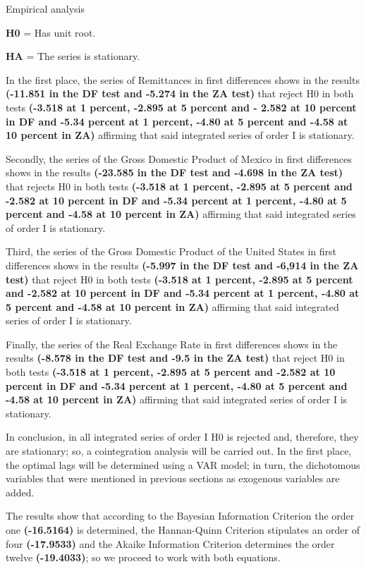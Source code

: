 \begin{frame}{Empirical analysis}
\begin{center}
\textbf{H0} = Has unit root.\par
\textbf{HA} = The series is stationary.
\end{center}
In the first place, the series of Remittances in first differences shows in the results \textbf{(-11.851 in the DF test and -5.274 in the ZA test)} that reject H0 in both tests \textbf{(-3.518 at 1 percent, -2.895 at 5 percent and - 2.582 at 10 percent in DF and -5.34 percent at 1 percent, -4.80 at 5 percent and -4.58 at 10 percent in ZA)} affirming that said integrated series of order I is stationary.\par
Secondly, the series of the Gross Domestic Product of Mexico in first differences shows in the results \textbf{(-23.585 in the DF test and -4.698 in the ZA test)} that rejects H0 in both tests \textbf{(-3.518 at 1 percent, -2.895 at 5 percent and -2.582 at 10 percent in DF and -5.34 percent at 1 percent, -4.80 at 5 percent and -4.58 at 10 percent in ZA)} affirming that said integrated series of order I is stationary.\par
Third, the series of the Gross Domestic Product of the United States in first differences shows in the results \textbf{(-5.997 in the DF test and -6,914 in the ZA test)} that reject H0 in both tests \textbf{(-3.518 at 1 percent, -2.895 at 5 percent and -2.582 at 10 percent in DF and -5.34 percent at 1 percent, -4.80 at 5 percent and -4.58 at 10 percent in ZA)} affirming that said integrated series of order I is stationary.\par
Finally, the series of the Real Exchange Rate in first differences shows in the results \textbf{(-8.578 in the DF test and -9.5 in the ZA test)} that reject H0 in both tests \textbf{(-3.518 at 1 percent, -2.895 at 5 percent and -2.582 at 10 percent in DF and -5.34 percent at 1 percent, -4.80 at 5 percent and -4.58 at 10 percent in ZA)} affirming that said integrated series of order I is stationary.\par
In conclusion, in all integrated series of order I H0 is rejected and, therefore, they are stationary; so, a cointegration analysis will be carried out. In the first place, the optimal lags will be determined using a VAR model; in turn, the dichotomous variables that were mentioned in previous sections as exogenous variables are added.\par
The results show that according to the Bayesian Information Criterion the order one \textbf{(-16.5164)} is determined, the Hannan-Quinn Criterion stipulates an order of four \textbf{(-17.9533)} and the Akaike Information Criterion determines the order twelve \textbf{(-19.4033)}; so we proceed to work with both equations.\par

\end{frame}
